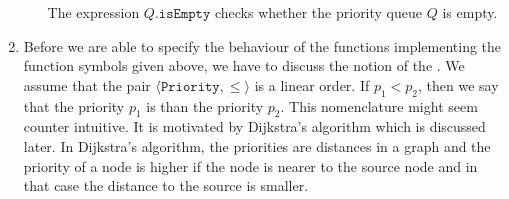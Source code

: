 \begin{Definition}
\begin{enumerate}
\begin{enumerate}
              The expression $Q.\texttt{isEmpty}$ checks whether the priority queue $Q$ is empty.
        \end{enumerate}
\item Before we are able to specify the behaviour of the functions implementing the function symbols
      given above, we have to discuss the notion of the .  We assume that the pair
      $\langle \texttt{Priority}, \leq \rangle$  is a linear order.
      If  $p_1 < p_2$, then we say that the priority $p_1$ is  than the priority $p_2$.  This
      nomenclature might seem counter intuitive.  It is motivated by 
      Dijkstra's algorithm which is discussed later.  In Dijkstra's algorithm, the priorities are
      distances in a graph and the priority of a node is higher if the node is nearer to the source
      node and in that case the distance to the source is smaller.


\end{enumerate}
\end{Definition}
